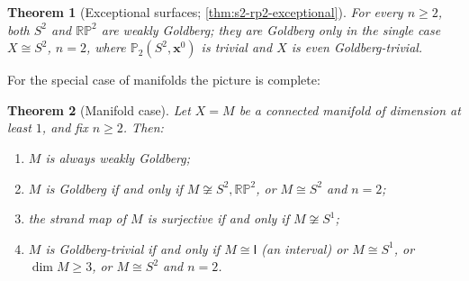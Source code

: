 \documentclass[reqno]{amsart}
\newtheorem{theorem}{Theorem}[section]
\theoremstyle{definition}
\newcommand\bfx{\mathbf{x}}
\newcommand{\PB}{\mathbb{P}}
\newcommand{\RP}{\mathbb{RP}}
\newcommand{\base}{\bfx^0}
\numberwithin{equation}{section}
\begin{document}
\begin{theorem}[Exceptional surfaces;
\cref{thm:s2-rp2-exceptional}]\label{thm:main-s2rp2-intro}
For every \(n\geq2\), both \(S^2\) and \(\RP^2\) are weakly
Goldberg; they are Goldberg only in the single case
\(X\cong S^2\), \(n=2\), where \(\PB_2(S^2,\base)\) is trivial
and \(X\) is even Goldberg-trivial.
\end{theorem}

For the special case of manifolds the picture is complete:

\begin{theorem}[Manifold case]\label{thm:manifold-summary}
Let \(X = M\) be a connected manifold of dimension at least \(1\),
and fix \(n\geq 2\). Then:
\begin{enumerate}[label=(\roman*),leftmargin=2em]
    \item \(M\) is always weakly Goldberg;
    \item \(M\) is Goldberg if and only if
          \(M\not\cong S^2,\RP^2\), or \(M\cong S^2\) and
          \(n=2\);
    \item the strand map of \(M\) is surjective if and only if
          \(M\not\cong S^1\);
    \item \(M\) is Goldberg-trivial if and only if
          \(M\cong\mathsf{I}\) (an interval) or \(M\cong S^1\),
          or \(\dim M\geq 3\), or \(M\cong S^2\) and \(n=2\).
\end{enumerate}
\end{theorem}
\end{document}

